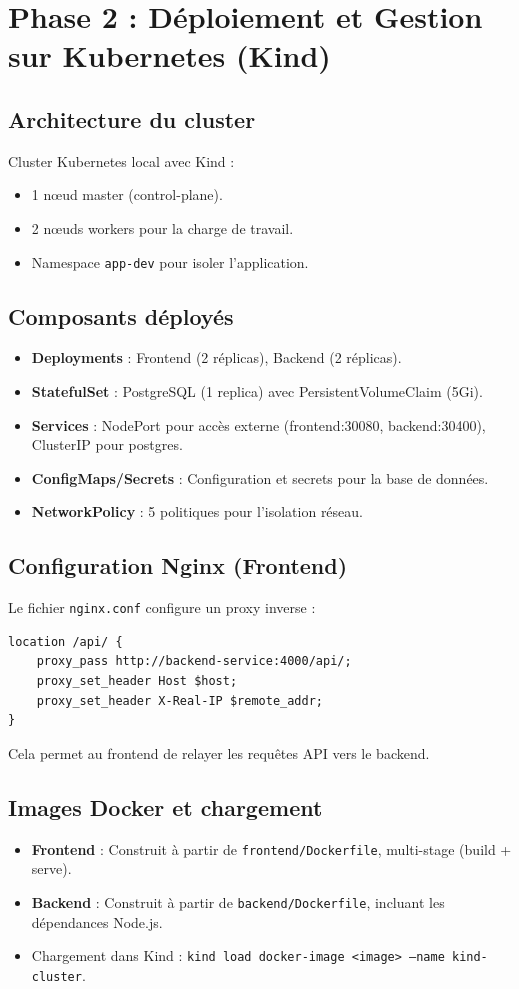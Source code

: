 \documentclass[11pt,a4paper,oneside]{report}
\begin{document}
\chapter{Phase 2 : Déploiement et Gestion sur Kubernetes (Kind)}

\section{Architecture du cluster}
Cluster Kubernetes local avec Kind :
\begin{itemize}
\item 1 nœud master (control-plane).
\item 2 nœuds workers pour la charge de travail.
\item Namespace \texttt{app-dev} pour isoler l'application.
\end{itemize}

\section{Composants déployés}
\begin{itemize}
\item \textbf{Deployments} : Frontend (2 réplicas), Backend (2 réplicas).
\item \textbf{StatefulSet} : PostgreSQL (1 replica) avec PersistentVolumeClaim (5Gi).
\item \textbf{Services} : NodePort pour accès externe (frontend:30080, backend:30400), ClusterIP pour postgres.
\item \textbf{ConfigMaps/Secrets} : Configuration et secrets pour la base de données.
\item \textbf{NetworkPolicy} : 5 politiques pour l'isolation réseau.
\end{itemize}

\section{Configuration Nginx (Frontend)}
Le fichier \texttt{nginx.conf} configure un proxy inverse :
\begin{lstlisting}
location /api/ {
    proxy_pass http://backend-service:4000/api/;
    proxy_set_header Host $host;
    proxy_set_header X-Real-IP $remote_addr;
}
\end{lstlisting}
Cela permet au frontend de relayer les requêtes API vers le backend.

\section{Images Docker et chargement}
\begin{itemize}
\item \textbf{Frontend} : Construit à partir de \texttt{frontend/Dockerfile}, multi-stage (build + serve).
\item \textbf{Backend} : Construit à partir de \texttt{backend/Dockerfile}, incluant les dépendances Node.js.
\item Chargement dans Kind : \texttt{kind load docker-image <image> --name kind-cluster}.
\end{itemize}
\end{document}
